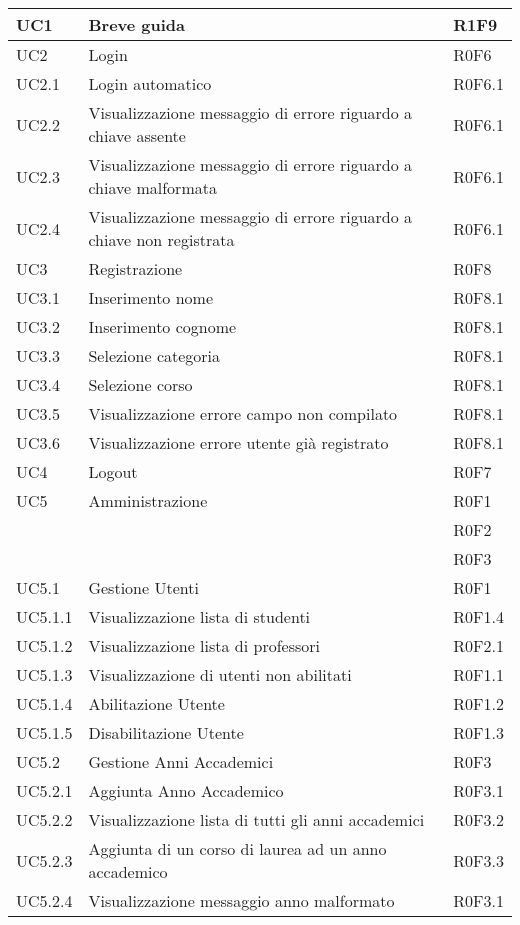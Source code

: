 \documentclass[AnalisiDeiRequisiti.tex]{subfiles}
\begin{document}
\begin{longtable}[H]{|p{2cm}|p{5cm}|p{5cm}|}
	UC1 & Breve guida & R1F9 \\ \hline
	UC2 & Login & R0F6 \\ \hline
	UC2.1 & Login automatico & R0F6.1 \\ \hline
	UC2.2 & Visualizzazione messaggio di errore riguardo a chiave assente & R0F6.1 \\ \hline
	UC2.3 & Visualizzazione messaggio di errore riguardo a chiave malformata & R0F6.1 \\ \hline
	UC2.4 & Visualizzazione messaggio di errore riguardo a chiave non registrata & R0F6.1 \\ \hline
	UC3 & Registrazione & R0F8 \\ \hline %
	UC3.1 & Inserimento nome & R0F8.1 \\ \hline
	UC3.2 & Inserimento cognome & R0F8.1 \\ \hline
	UC3.3 & Selezione categoria & R0F8.1 \\ \hline
	UC3.4 & Selezione corso & R0F8.1 \\ \hline
	UC3.5 & Visualizzazione errore campo non compilato & R0F8.1 \\ \hline
	UC3.6 & Visualizzazione errore utente già registrato & R0F8.1 \\ \hline
	UC4 & Logout & R0F7 \\ \hline
	UC5 & Amministrazione &  R0F1 \\ 
	& & R0F2 \\
	& & R0F3 \\ \hline
	UC5.1 & Gestione Utenti &  R0F1 \\ \hline
	UC5.1.1 & Visualizzazione lista di studenti & R0F1.4 \\ \hline
	UC5.1.2 & Visualizzazione lista di professori &  R0F2.1\\ \hline
	UC5.1.3 & Visualizzazione di utenti non abilitati & R0F1.1 \\ \hline
	UC5.1.4 & Abilitazione Utente & R0F1.2 \\  \hline 
	UC5.1.5 & Disabilitazione Utente & R0F1.3 \\ \hline
	UC5.2 & Gestione Anni Accademici &  R0F3 \\ \hline
	UC5.2.1 & Aggiunta Anno Accademico &  R0F3.1 \\ \hline
	UC5.2.2 & Visualizzazione lista di tutti gli anni accademici & R0F3.2 \\ \hline
	UC5.2.3 & Aggiunta di un corso di laurea ad un anno accademico & R0F3.3 \\ \hline
	UC5.2.4 & Visualizzazione messaggio anno malformato & R0F3.1 \\ \hline

\end{longtable}
\end{document}
